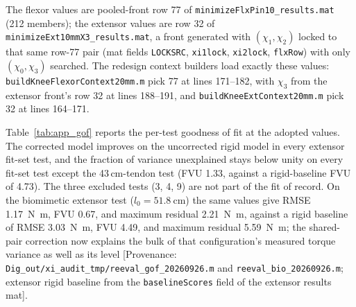 The flexor values are pooled-front row 77 of \texttt{minimizeFlxPin10\_results.mat} (212 members); the extensor values are row 32 of \texttt{minimizeExt10mmX3\_results.mat}, a front generated with $(\chi_{1}, \chi_{2})$ locked to that same row-77 pair (mat fields \texttt{LOCKSRC}, \texttt{xi1lock}, \texttt{xi2lock}, \texttt{flxRow}) with only $(\chi_{0}, \chi_{3})$ searched. The redesign context builders load exactly these values: \texttt{buildKneeFlexorContext20mm.m} pick 77 at lines 171--182, with $\chi_{3}$ from the extensor front's row 32 at lines 188--191, and \texttt{buildKneeExtContext20mm.m} pick 32 at lines 164--171.

Table~\ref{tab:app_gof} reports the per-test goodness of fit at the adopted values. The corrected model improves on the uncorrected rigid model in every extensor fit-set test, and the fraction of variance unexplained stays below unity on every fit-set test except the 43\,cm-tendon test (FVU 1.33, against a rigid-baseline FVU of 4.73). The three excluded tests (3, 4, 9) are not part of the fit of record. On the biomimetic extensor test ($l_{0} = \qty{51.8}{\cm}$) the same values give RMSE \qty{1.17}{\N\m}, FVU 0.67, and maximum residual \qty{2.21}{\N\m}, against a rigid baseline of RMSE \qty{3.03}{\N\m}, FVU 4.49, and maximum residual \qty{5.59}{\N\m}; the shared-pair correction now explains the bulk of that configuration's measured torque variance as well as its level [Provenance: \texttt{Dig\_out/xi\_audit\_tmp/reeval\_gof\_20260926.m} and \texttt{reeval\_bio\_20260926.m}; extensor rigid baseline from the \texttt{baselineScores} field of the extensor results mat].

